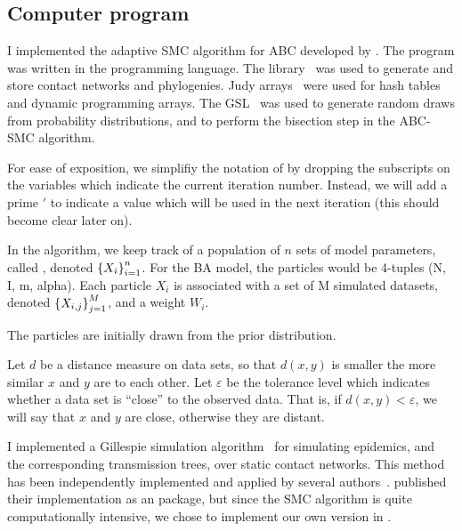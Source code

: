 \subsection{Computer program}

I implemented the adaptive \gls{SMC} algorithm for \gls{ABC} developed by
\textcite{del2012adaptive}. The program was written in the
 programming language. The 
library~\autocite{csardi2006igraph} was used to generate and store contact
networks and phylogenies. Judy arrays~\autocite{baskins2004judy} were used for
hash tables and dynamic programming arrays. The
\gls{GSL}~\autocite{gough2009gnu} was used to generate random draws from
probability distributions, and to perform the bisection step in the
\gls{ABC}-\gls{SMC} algorithm.

For ease of exposition, we simplifiy the notation of \textcite{del2012adaptive}
by dropping the subscripts on the variables which indicate the current
iteration number. Instead, we will add a prime $'$ to indicate a value which
will be used in the next iteration (this should become clear later on). 

In the algorithm, we keep track of a population of $n$ sets of model
parameters, called , denoted $\left\lbrace X_i\right\rbrace_{i=1}^{n}$. For the
\gls{BA} model, the particles would be 4-tuples (\gls{N}, \gls{I}, \gls{m},
\gls{alpha}). Each particle $X_i$ is associated with a set of \gls{M} simulated
datasets, denoted $\left\lbrace X_{i,j}\right\rbrace_{j=1}^M$, and a weight $W_i$. 

The particles are initially drawn from the prior distribution.

Let $d$ be a
distance measure on data sets, so that $d(x, y)$ is smaller the more similar
$x$ and $y$ are to each other. Let $\varepsilon$ be the tolerance level which
indicates whether a data set is ``close'' to the observed data. That is, if
$d(x, y) < \varepsilon$, we will say that $x$ and $y$ are close, otherwise they
are distant.

I implemented a Gillespie simulation algorithm~\autocite{gillespie1976general}
for simulating epidemics, and the corresponding transmission trees, over static
contact networks. This method has been independently implemented and applied by
several authors~\autocite[\textit{e.g.}][]{o2010contact, robinson2013dynamics,
leventhal2012inferring, groendyke2011bayesian}.
\textcite{groendyke2011bayesian} published their implementation as an
 package, but since the \gls{SMC} algorithm is quite
computationally intensive, we chose to implement our own version in
.

